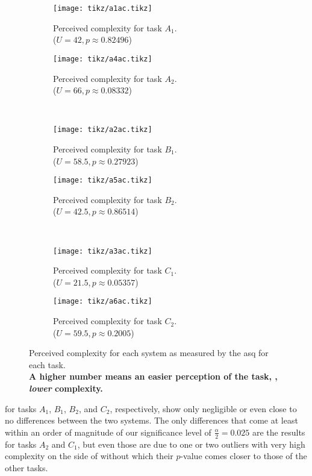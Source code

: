 \documentclass[../thesis]{subfiles}
\begin{document}
\begin{figure}
	\begin{subfigure}[T]{0.5\textwidth}
		\caption{Perceived complexity for task $A_1$.\\
			($U = 42, p \approx 0.82496$)
			\label{fig:a1ac}}
		\texttt{[image: tikz/a1ac.tikz]}
	\end{subfigure}\hfill
	\begin{subfigure}[T]{0.5\textwidth}
		\caption{Perceived complexity for task $A_2$.\\
			($U = 66, p \approx 0.08332$)\label{fig:a2ac}}
		\texttt{[image: tikz/a4ac.tikz]}
	\end{subfigure}\\
	\begin{subfigure}[T]{0.5\textwidth}
		\caption{Perceived complexity for task $B_1$.\\
			($U = 58.5, p \approx 0.27923$)\label{fig:b1ac}}
		\texttt{[image: tikz/a2ac.tikz]}
	\end{subfigure}\hfill
	\begin{subfigure}[T]{0.5\textwidth}
		\caption{Perceived complexity for task $B_2$.\\
			($U = 42.5, p \approx 0.86514$)\label{fig:b2ac}}
		\texttt{[image: tikz/a5ac.tikz]}
	\end{subfigure}\\
	\begin{subfigure}[T]{0.5\textwidth}
		\caption{Perceived complexity for task $C_1$.\\
			($U = 21.5, p \approx 0.05357$)\label{fig:c1ac}}
		\texttt{[image: tikz/a3ac.tikz]}
	\end{subfigure}\hfill
	\begin{subfigure}[T]{0.5\textwidth}
		\caption{Perceived complexity for task $C_2$.\\
			($U = 59.5, p \approx 0.2005$)\label{fig:c2ac}}
		\texttt{[image: tikz/a6ac.tikz]}
	\end{subfigure}
	\caption{Perceived complexity for each system as measured by the \gls{asq} for each task.\\
		\textbf{A higher number means an easier perception of the task, \ie, \emph{lower} complexity.}}\label{fig:asqc}
\end{figure}

 for tasks $A_1$, $B_1$, $B_2$, and $C_2$, respectively, show only negligible or even close to no differences between the two systems.
The only differences that come at least within an order of magnitude of our significance level of $\frac{\alpha}{2} = 0.025$ are the results for tasks $A_2$ and $C_1$, but even those are due to one or two outliers with very high complexity on the side of \SEE{} without which their $p$-value comes closer to those of the other tasks.
\end{document}
